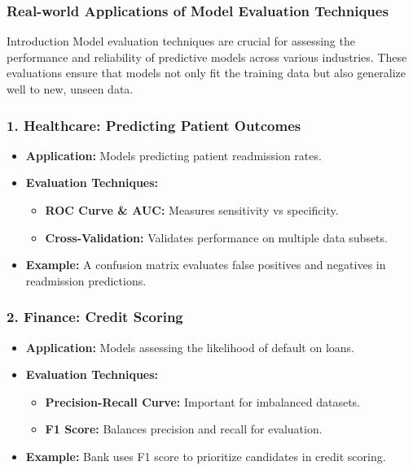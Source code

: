 \documentclass[aspectratio=169]{beamer}
\begin{document}
\begin{frame}[fragile]
    \frametitle{Real-world Applications of Model Evaluation Techniques}
    \begin{block}{Introduction}
        Model evaluation techniques are crucial for assessing the performance and reliability of predictive models across various industries. 
        These evaluations ensure that models not only fit the training data but also generalize well to new, unseen data.
    \end{block}
\end{frame}

\begin{frame}[fragile]
    \frametitle{1. Healthcare: Predicting Patient Outcomes}
    \begin{itemize}
        \item \textbf{Application:} Models predicting patient readmission rates.
        \item \textbf{Evaluation Techniques:}
        \begin{itemize}
            \item \textbf{ROC Curve \& AUC:} Measures sensitivity vs specificity.
            \item \textbf{Cross-Validation:} Validates performance on multiple data subsets.
        \end{itemize}
        \item \textbf{Example:} A confusion matrix evaluates false positives and negatives in readmission predictions.
    \end{itemize}
\end{frame}

\begin{frame}[fragile]
    \frametitle{2. Finance: Credit Scoring}
    \begin{itemize}
        \item \textbf{Application:} Models assessing the likelihood of default on loans.
        \item \textbf{Evaluation Techniques:}
        \begin{itemize}
            \item \textbf{Precision-Recall Curve:} Important for imbalanced datasets.
            \item \textbf{F1 Score:} Balances precision and recall for evaluation.
        \end{itemize}
        \item \textbf{Example:} Bank uses F1 score to prioritize candidates in credit scoring.
    \end{itemize}
\end{frame}
\end{document}
